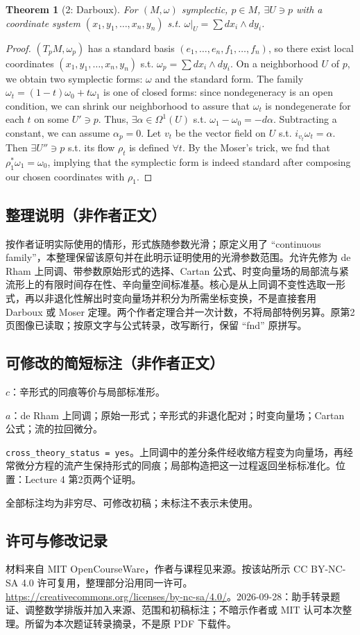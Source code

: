 \documentclass[UTF8,11pt]{ctexart}
\newtheorem*{theorem}{Theorem}
\theoremstyle{definition}
\begin{document}
\begin{theorem}[2: Darboux]
For $(M,\omega)$ symplectic, $p\in M$, $\exists U\ni p$ with a coordinate system $(x_1,y_1,\ldots,x_n,y_n)$ s.t. $\omega|_U=\sum dx_i\wedge dy_i$.
\end{theorem}
\begin{proof}
$(T_pM,\omega_p)$ has a standard basis $(e_1,\ldots,e_n,f_1,\ldots,f_n)$, so there exist local coordinates $(x_1,y_1,\ldots,x_n,y_n)$ s.t. $\omega_p=\sum dx_i\wedge dy_i$. On a neighborhood $U$ of $p$, we obtain two symplectic forms: $\omega$ and the standard form. The family $\omega_t=(1-t)\omega_0+t\omega_1$ is one of closed forms: since nondegeneracy is an open condition, we can shrink our neighborhood to assure that $\omega_t$ is nondegenerate for each $t$ on some $U'\ni p$. Thus, $\exists\alpha\in\Omega^1(U)$ s.t. $\omega_1-\omega_0=-d\alpha$. Subtracting a constant, we can assume $\alpha_p=0$. Let $v_t$ be the vector field on $U$ s.t. $i_{v_t}\omega_t=\alpha$. Then $\exists U''\ni p$ s.t. its flow $\rho_t$ is defined $\forall t$. By the Moser's trick, we fnd that $\rho_1^*\omega_1=\omega_0$, implying that the symplectic form is indeed standard after composing our chosen coordinates with $\rho_1$.
\end{proof}

\subsection*{整理说明（非作者正文）}
按作者证明实际使用的情形，形式族随参数光滑；原定义用了 ``continuous family''，本整理保留该原句并在此明示证明使用的光滑参数范围。允许先修为 de Rham 上同调、带参数原始形式的选择、Cartan 公式、时变向量场的局部流与紧流形上的有限时间存在性、辛向量空间标准基。核心是从上同调不变性选取一形式，再以非退化性解出时变向量场并积分为所需坐标变换，不是直接套用 Darboux 或 Moser 定理。两个作者定理合并一次计数，不将局部特例另算。原第2页图像已读取；按原文字与公式转录，改写断行，保留 ``fnd'' 原拼写。
\subsection*{可修改的简短标注（非作者正文）}
$c$：辛形式的同痕等价与局部标准形。

$a$：de Rham 上同调；原始一形式；辛形式的非退化配对；时变向量场；Cartan 公式；流的拉回微分。

\texttt{cross\_theory\_status = yes}。上同调中的差分条件经收缩方程变为向量场，再经常微分方程的流产生保持形式的同痕；局部构造把这一过程返回坐标标准化。位置：Lecture 4 第2页两个证明。

全部标注均为非穷尽、可修改初稿；未标注不表示未使用。
\subsection*{许可与修改记录}
材料来自 MIT OpenCourseWare，作者与课程见来源。按该站所示 CC BY-NC-SA 4.0 许可复用，整理部分沿用同一许可。\url{https://creativecommons.org/licenses/by-nc-sa/4.0/}。2026-09-28：助手转录题证、调整数学排版并加入来源、范围和初稿标注；不暗示作者或 MIT 认可本次整理。所留为本次题证转录摘录，不是原 PDF 下载件。
\end{document}
